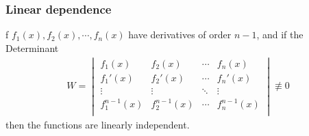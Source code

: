 \documentclass[../main.tex]{subfiles}
\begin{document}
\subsubsection*{Linear dependence}f $f_1(x), f_2(x),\cdots, f_n(x)$ have derivatives of order $n - 1$, and if the Determinant
\begin{align*}
	W=\begin{vmatrix}
		  f_1(x)       & f_2(x)       & \cdots & f_n(x)       \\
		  f_1'(x)      & f_2'(x)      & \cdots & f_n'(x)      \\
		  \vdots       & \vdots       & \ddots & \vdots       \\
		  f_1^{n-1}(x) & f_2^{n-1}(x) & \cdots & f_n^{n-1}(x) \\
	  \end{vmatrix}\not\equiv0
\end{align*}then the functions are linearly independent.
\end{document}
